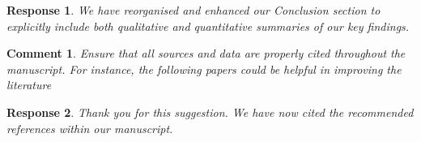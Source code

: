 \documentclass [a4paper,11pt]{article}
\theoremstyle{blue}
\newtheorem{question}{Comment}[section]
\theoremstyle{blue}
\theoremstyle{note}
\newtheorem{answer}{Response}[section]
\theoremstyle{note}
\begin{document}
\begin{answer}

We have reorganised and enhanced our Conclusion section to explicitly include both qualitative and quantitative summaries of our key findings.

\end{answer}

\begin{question}

Ensure that all sources and data are properly cited throughout the manuscript. For instance, the following papers could be helpful in improving the literature

\end{question}

\begin{answer}

Thank you for this suggestion. We have now cited the recommended references within our manuscript.

\end{answer}
	
\end{document}
